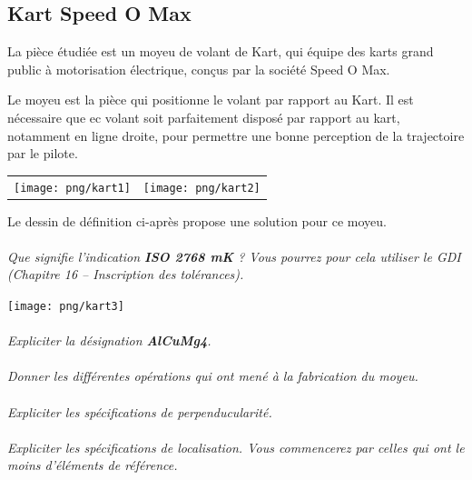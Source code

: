 \documentclass[11pt,oneside]{article}
\begin{document}
\subsection*{Kart Speed O Max}
La pièce étudiée est un moyeu de volant de Kart, qui équipe des karts grand
public à motorisation électrique, conçus par la société Speed O Max.

Le moyeu est la pièce qui positionne le volant par rapport au Kart. Il est
nécessaire que ec volant soit parfaitement disposé par rapport au kart,
notamment en ligne droite, pour permettre une bonne
perception de la trajectoire par le pilote.

\begin{center}
 \begin{tabular}{cc}
  \texttt{[image: png/kart1]}&
\texttt{[image: png/kart2]}
 \end{tabular}
\end{center}

Le dessin de définition ci-après propose une solution pour ce moyeu.

\paragraph{}
\textit{Que signifie l'indication \textbf{ISO 2768 mK} ? Vous pourrez pour cela utiliser le GDI (Chapitre 16 -- Inscription des tolérances).}

\begin{minipage}[c]{.45\linewidth}
\begin{center}
\texttt{[image: png/kart3]}
\end{center}
\end{minipage} \hfill
\begin{minipage}[c]{.45\linewidth}
\paragraph{}
\textit{Expliciter la désignation \textbf{AlCuMg4}.} 

\paragraph{}
\textit{Donner les différentes opérations qui ont mené à la fabrication du moyeu.}

\paragraph{}
\textit{Expliciter les spécifications de perpenducularité.}

\paragraph{}
\textit{Expliciter les spécifications de localisation. Vous commencerez par celles qui ont le moins d'éléments de référence.}


\end{minipage}
\end{document}
